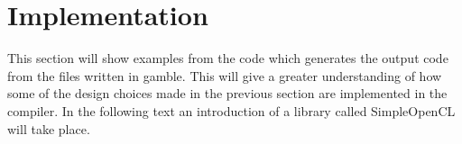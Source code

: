 \section{Implementation}
This section will show examples from the code which generates the output code from the files written in \gls{gamble}.
This will give a greater understanding of how some of the design choices made in the previous section are implemented in the compiler.
In the following text an introduction of a library called SimpleOpenCL will take place.
